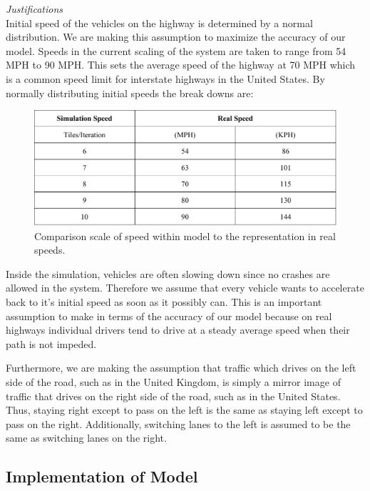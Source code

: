 \documentclass{amsart}
\begin{document}
\textit{Justifications}\\

	Initial speed of the vehicles on the highway is determined by a normal distribution. We are making this assumption to maximize the accuracy of our model. Speeds in the current scaling of the system are taken to range from 54 MPH to 90 MPH. This sets the average speed of the highway at 70 MPH which is a common speed limit for interstate highways in the United States. By normally distributing initial speeds the break downs are:

\begin{figure}[h]
\centering
\includegraphics[scale=0.5]{MCM-SimulationSpeedTable.pdf}
\caption{Comparison scale of speed within model to the representation in real speeds.}
\label{MCM-SimulationSpeedTable}
\end{figure}

	Inside the simulation, vehicles are often slowing down since no crashes are allowed in the system. Therefore we assume that every vehicle wants to accelerate back to it's initial speed as soon as it possibly can. This is an important assumption to make in terms of the accuracy of our model because on real highways individual drivers tend to drive at a steady average speed when their path is not impeded. 
	
	Furthermore, we are making the assumption that traffic which drives on the left side of the road, such as in the United Kingdom, is simply a mirror image of traffic that drives on the right side of the road, such as in the United States. Thus, staying right except to pass on the left is the same as staying left except to pass on the right. Additionally, switching lanes to the left is assumed to be the same as switching lanes on the right.
	
	\subsection{Implementation of Model}
	
\end{document}
